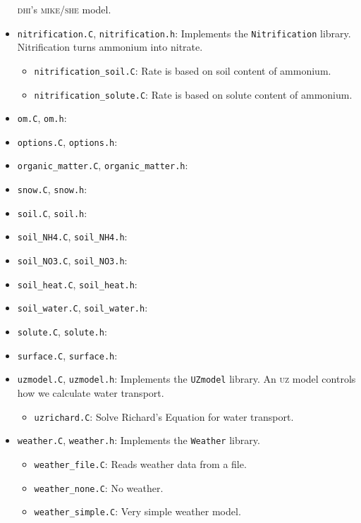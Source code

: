\documentclass{article}
\newcommand{\code}[1]{\texttt{#1}}
\newcommand{\file}[1]{\texttt{#1}}
\begin{document}
\begin{itemize}
  \textsc{dhi}'s \textsc{mike/she} model.
\item \file{nitrification.C}, \file{nitrification.h}: Implements the
  \code{Nitrification} library.  Nitrification turns ammonium into
  nitrate.
  \begin{itemize}
  \item \file{nitrification\_soil.C}:  Rate is based on soil content
    of ammonium.
  \item \file{nitrification\_solute.C}: Rate is based on solute content
    of ammonium.
  \end{itemize}
\item \file{om.C}, \file{om.h}:
\item \file{options.C}, \file{options.h}:
\item \file{organic\_matter.C}, \file{organic\_matter.h}:
\item \file{snow.C}, \file{snow.h}:
\item \file{soil.C}, \file{soil.h}:
\item \file{soil\_NH4.C}, \file{soil\_NH4.h}:
\item \file{soil\_NO3.C}, \file{soil\_NO3.h}:
\item \file{soil\_heat.C}, \file{soil\_heat.h}:
\item \file{soil\_water.C}, \file{soil\_water.h}:
\item \file{solute.C}, \file{solute.h}:
\item \file{surface.C}, \file{surface.h}:
\item \file{uzmodel.C}, \file{uzmodel.h}:  Implements the
  \code{UZmodel} library.  An \textsc{uz} model controls how we
  calculate water transport.
  \begin{itemize}
  \item \file{uzrichard.C}: Solve Richard's Equation for water
    transport. 
  \end{itemize}
\item \file{weather.C}, \file{weather.h}:  Implements the
  \code{Weather} library.
  \begin{itemize}
  \item \file{weather\_file.C}: Reads weather data from a file.
  \item \file{weather\_none.C}: No weather.
  \item \file{weather\_simple.C}: Very simple weather model.
  \end{itemize}
\end{itemize}
\end{document}
